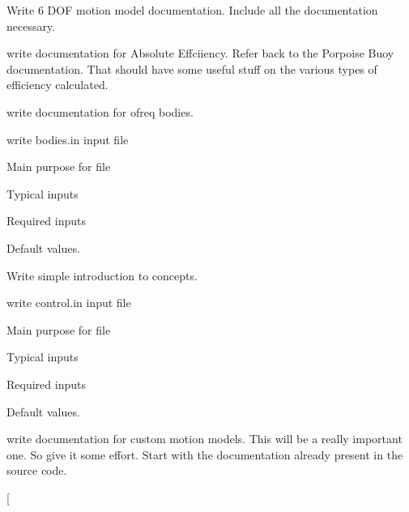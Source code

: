 
\begin{DoxyRefList}
\item[\label{todo__todo000041}%
\hypertarget{todo__todo000041}{}%
Page \hyperlink{sixdof}{6 Degree of Freedom (6 D\-O\-F) Motion Model} ]Write 6 D\-O\-F motion model documentation. Include all the documentation necessary. 
\item[\label{todo__todo000016}%
\hypertarget{todo__todo000016}{}%
Page \hyperlink{efficiency_absolute}{Absolute Efficiency} ]write documentation for Absolute Effciiency. Refer back to the Porpoise Buoy documentation. That should have some useful stuff on the various types of efficiency calculated. 
\item[\label{todo__todo000001}%
\hypertarget{todo__todo000001}{}%
Page \hyperlink{concept_bodies}{Bodies in o\-Freq} ]write documentation for ofreq bodies. 
\item[\label{todo__todo000006}%
\hypertarget{todo__todo000006}{}%
Page \hyperlink{in_bodies}{Bodies.in Input File} ]write bodies.\-in input file
\begin{DoxyItemize}
\item Main purpose for file
\item Typical inputs
\item Required inputs
\item Default values. 
\end{DoxyItemize}
\item[\label{todo__todo000005}%
\hypertarget{todo__todo000005}{}%
Page \hyperlink{concepts}{Concepts} ]Write simple introduction to concepts. 
\item[\label{todo__todo000007}%
\hypertarget{todo__todo000007}{}%
Page \hyperlink{in_control}{Control.in Input File} ]write control.\-in input file
\begin{DoxyItemize}
\item Main purpose for file
\item Typical inputs
\item Required inputs
\item Default values. 
\end{DoxyItemize}
\item[\label{todo__todo000040}%
\hypertarget{todo__todo000040}{}%
Page \hyperlink{custom_motion_models}{Custom Motion Models} ]write documentation for custom motion models. This will be a really important one. So give it some effort. Start with the documentation already present in the source code. 
\item[\label{todo__todo000008}%
\hypertarget{todo__todo000008}{}%

\end{DoxyRefList}
